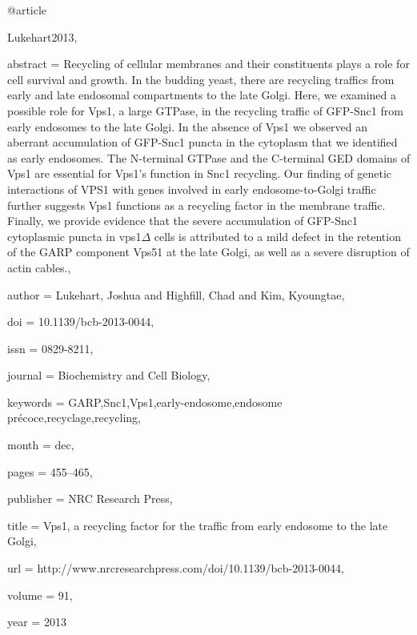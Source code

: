 @article{Lukehart2013,

abstract = {Recycling of cellular membranes and their constituents plays a role for cell survival and growth. In the budding yeast, there are recycling traffics from early and late endosomal compartments to the late Golgi. Here, we examined a possible role for Vps1, a large GTPase, in the recycling traffic of GFP-Snc1 from early endosomes to the late Golgi. In the absence of Vps1 we observed an aberrant accumulation of GFP-Snc1 puncta in the cytoplasm that we identified as early endosomes. The N-terminal GTPase and the C-terminal GED domains of Vps1 are essential for Vps1's function in Snc1 recycling. Our finding of genetic interactions of VPS1 with genes involved in early endosome-to-Golgi traffic further suggests Vps1 functions as a recycling factor in the membrane traffic. Finally, we provide evidence that the severe accumulation of GFP-Snc1 cytoplasmic puncta in vps1$\Delta$ cells is attributed to a mild defect in the retention of the GARP component Vps51 at the late Golgi, as well as a severe disruption of actin cables.},

author = {Lukehart, Joshua and Highfill, Chad and Kim, Kyoungtae},

doi = {10.1139/bcb-2013-0044},

issn = {0829-8211},

journal = {Biochemistry and Cell Biology},

keywords = {GARP,Snc1,Vps1,early-endosome,endosome pr{\'{e}}coce,recyclage,recycling},

month = {dec},

pages = {455--465},

publisher = { NRC Research Press},

title = {{Vps1, a recycling factor for the traffic from early endosome to the late Golgi}},

url = {http://www.nrcresearchpress.com/doi/10.1139/bcb-2013-0044},

volume = {91},

year = {2013}

}


